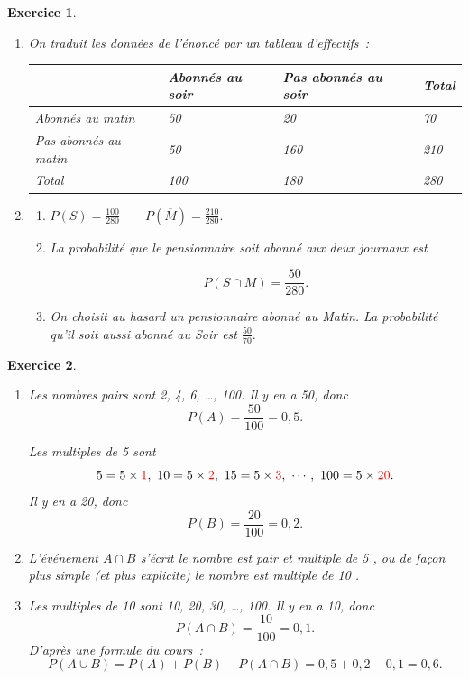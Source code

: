 \documentclass[10pt]{article}
\newtheorem{exo}{Exercice}
\begin{document}
\begin{exo}

\begin{enumerate}
\item On traduit les données de l'énoncé par un tableau d'effectifs~:

\begin{center}
 \begin{tabular}{|m{3.5cm}|m{3cm}|m{3cm}|m{3cm}|}\hline
&Abonnés au soir &Pas abonnés au soir& Total \\ \hline 
Abonnés au matin& 50& 20&70 \\ \hline
Pas abonnés au matin& 50&160 &210 \\ \hline
Total& 100& 180& 280\\ \hline
\end{tabular}
\end{center}
\item 
\begin{enumerate}
\item $P(S)=\frac{100}{280}\qquad P\left(\overline{M}\right)=\frac{210}{280}.$
\item La probabilité que le pensionnaire soit abonné aux deux journaux est

\[P\left(S\cap M\right)=\frac{50}{280}.\]
\item On choisit au hasard un pensionnaire abonné au \textit{Matin}. La probabilité qu'il soit aussi abonné au \textit{Soir} est $\frac{50}{70}.$
\end{enumerate}
\end{enumerate}

\end{exo}

\begin{exo}


\begin{enumerate}
\item Les nombres pairs sont 2, 4, 6, \dots , 100. Il y en a 50, donc \[P(A)=\frac{50}{100}=0,5.\]

Les multiples de 5 sont 
\[5=5\times \textcolor{red}{1},~10=5\times \textcolor{red}{2},~15=5\times \textcolor{red}{3},~\cdots,~100=5\times \textcolor{red}{20}.\] Il y en a 20, donc
\[P(B)=\frac{20}{100}=0,2.\]

\item L'événement $A\cap B$ s'écrit \og le nombre est pair et multiple de 5 \fg, ou de façon plus simple (et plus explicite) \og le nombre est multiple de 10 \fg.
\item Les multiples de 10 sont 10, 20, 30, \dots , 100. Il y en a 10, donc \[P(A\cap B)=\frac{10}{100}=0,1.\]
D'après une formule du cours~:
\[P(A\cup B)=P(A)+P(B)-P(A\cap B)=0,5+0,2-0,1=0,6.\]
\end{enumerate}

\end{exo}
\end{document}
